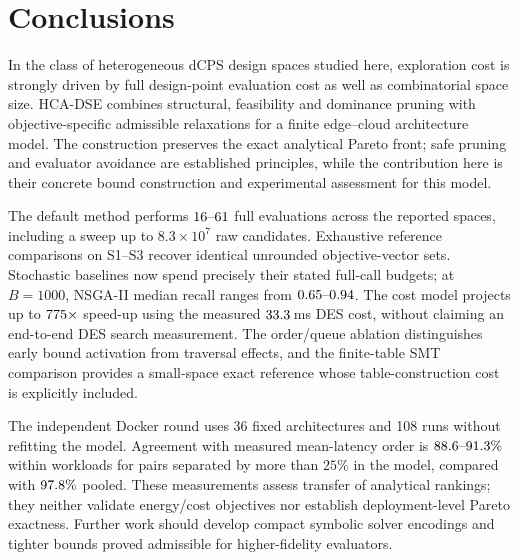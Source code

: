 \section{Conclusions}
\label{sec:conclusion}
In the class of heterogeneous dCPS design spaces studied here, exploration cost is
strongly driven by full design-point evaluation cost as well as combinatorial space size.
HCA-DSE combines structural, feasibility and dominance pruning with objective-specific
admissible relaxations for a finite edge--cloud architecture model. The construction
preserves the exact analytical Pareto front; safe pruning and evaluator avoidance are
established principles, while the contribution here is their concrete bound construction
and experimental assessment for this model.

The default method performs $16\text{--}61$ full evaluations across the reported spaces,
including a sweep up to $8.3\times10^7$ raw candidates. Exhaustive reference comparisons
on S1--S3 recover identical unrounded objective-vector sets. Stochastic baselines now
spend precisely their stated full-call budgets; at $B=1000$, NSGA-II median recall ranges
from $0.65\text{--}0.94$. The cost model projects up to $775\times$
speed-up using the measured $33.3$\,ms DES cost, without claiming an end-to-end
DES search measurement. The order/queue ablation distinguishes early bound activation
from traversal effects, and the finite-table SMT comparison provides a small-space exact
reference whose table-construction cost is explicitly included.

The independent Docker round uses 36 fixed architectures and 108 runs without refitting
the model. Agreement with measured mean-latency order is $88.6\text{--}91.3\%$
within workloads for pairs separated by more than $25\%$ in the model, compared with
$97.8\%$ pooled. These measurements assess transfer of analytical rankings;
they neither validate energy/cost objectives nor establish deployment-level Pareto
exactness. Further work should develop compact symbolic solver encodings and tighter
bounds proved admissible for higher-fidelity evaluators.
